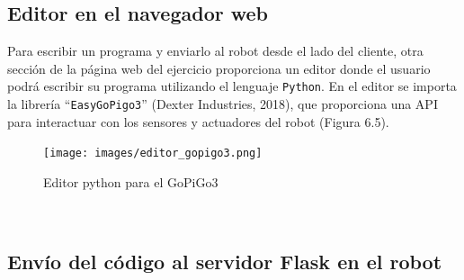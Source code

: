 \documentclass{report}
\begin{document}
\subsection{Editor en el navegador web}

Para escribir un programa y enviarlo al robot desde el lado del cliente, otra sección de la página web del ejercicio proporciona un editor donde el usuario podrá escribir su programa utilizando el lenguaje \texttt{Python}. En el editor se importa la librería “\texttt{EasyGoPigo3}” (Dexter Industries, 2018), que proporciona una API para interactuar con los sensores y actuadores del robot (Figura 6.5).
\\
\begin{figure}[h!]
  \centering
    \texttt{[image: images/editor\_gopigo3.png]}
  \caption{Editor python para el GoPiGo3}
  \label{Editor python para el GoPiGo3}
\end{figure}
\\

\subsection{Envío del código al servidor Flask en el robot}
\end{document}
